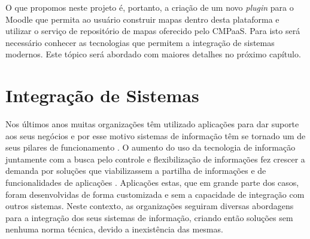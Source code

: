 \documentclass[
	12pt,				%
	openright,			%
	oneside,			%
	a4paper,			%
	english,			%
	french,				%
	spanish,			%
	brazil				%
	]{abntex2}
\begin{document}
O que propomos neste projeto é, portanto, a criação de um novo \textit{plugin} para o Moodle que permita ao usuário construir mapas dentro desta plataforma e utilizar o serviço de repositório de mapas oferecido pelo CMPaaS. Para isto será necessário conhecer as tecnologias que permitem a integração de sistemas modernos. Este tópico será abordado com maiores detalhes no próximo capítulo.  

\begin{table}[htb]
\end{table}




\chapter{Integração de Sistemas}

Nos últimos anos muitas organizações têm utilizado aplicações para dar suporte aos seus negócios e por esse motivo sistemas de informação têm se tornado um de seus pilares de funcionamento \cite{martins2006integraccao}. O aumento do uso da tecnologia de informação juntamente com a busca pelo controle e flexibilização de informações fez crescer a demanda por soluções que viabilizassem a partilha de informações e de funcionalidades de aplicações \cite{edwards2000application}. Aplicações estas, que em grande parte dos casos, foram desenvolvidas de forma customizada e sem a capacidade de integração com outros sistemas. Neste contexto, as organizações seguiram diversas abordagens para a integração dos seus sistemas de informação, criando então soluções sem nenhuma norma técnica, devido a inexistência das mesmas. 
\end{document}
